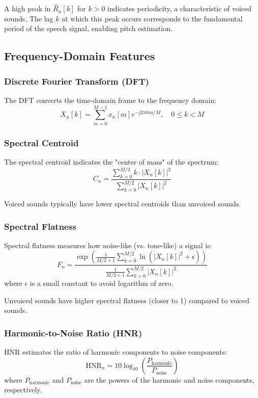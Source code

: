 \documentclass[10pt,journal,compsoc]{IEEEtran}
\begin{document}
A high peak in $\hat{R}_n[k]$ for $k > 0$ indicates periodicity, a characteristic of voiced sounds. The lag $k$ at which this peak occurs corresponds to the fundamental period of the speech signal, enabling pitch estimation.

\subsection{Frequency-Domain Features}

\subsubsection{Discrete Fourier Transform (DFT)}
The DFT converts the time-domain frame to the frequency domain:
\begin{equation}
X_n[k] = \sum_{m=0}^{M-1} x_n[m] e^{-j2\pi km/M}, \quad 0 \leq k < M
\end{equation}

\subsubsection{Spectral Centroid}
The spectral centroid indicates the "center of mass" of the spectrum:
\begin{equation}
C_n = \frac{\sum_{k=0}^{M/2} k \cdot |X_n[k]|^2}{\sum_{k=0}^{M/2} |X_n[k]|^2}
\end{equation}

Voiced sounds typically have lower spectral centroids than unvoiced sounds.

\subsubsection{Spectral Flatness}
Spectral flatness measures how noise-like (vs. tone-like) a signal is:
\begin{equation}
F_n = \frac{\exp\left(\frac{1}{M/2+1} \sum_{k=0}^{M/2} \ln(|X_n[k]|^2 + \epsilon)\right)}{\frac{1}{M/2+1} \sum_{k=0}^{M/2} |X_n[k]|^2}
\end{equation}
where $\epsilon$ is a small constant to avoid logarithm of zero.

Unvoiced sounds have higher spectral flatness (closer to 1) compared to voiced sounds.

\subsubsection{Harmonic-to-Noise Ratio (HNR)}
HNR estimates the ratio of harmonic components to noise components:
\begin{equation}
\text{HNR}_n = 10 \log_{10}\left(\frac{P_{\text{harmonic}}}{P_{\text{noise}}}\right)
\end{equation}
where $P_{\text{harmonic}}$ and $P_{\text{noise}}$ are the powers of the harmonic and noise components, respectively.
\end{document}
